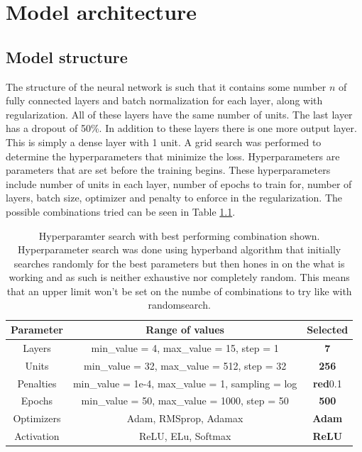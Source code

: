 
\chapter{Model architecture} %

\label{Chapter4} %


\section{Model structure}
The structure of the neural network is such that it contains some number $n$ of fully connected layers and batch normalization for each layer, along with regularization. All of these layers have the same number of units. The last layer has a dropout of 50\%. In addition to these layers there is one more output layer. This is simply a dense layer with 1 unit. A grid search was performed to determine the hyperparameters that minimize the loss. Hyperparameters are parameters that are set before the training begins\cite{hyperparameters_definition}. These hyperparameters include number of units in each layer, number of epochs to train for, number of layers, batch size, optimizer and penalty to enforce in the regularization. The possible combinations tried can be seen in Table \ref{table:gridSearchHyperparamters}.

\begin{table}[h]
    \centering
    \caption[Hyperparamter search with best performing combination.]{Hyperparamter search with best performing combination shown. Hyperparameter search was done using hyperband algorithm that initially searches randomly for the best parameters but then hones in on the what is working and as such is neither exhaustive nor completely random. This means that an upper limit won't be set on the numbe of combinations to try like with randomsearch.}
    \label{table:gridSearchHyperparamters}
    \begin{tabular}{c|c|c}
        Parameter & Range of values & Selected\\\hline
        Layers &  min\_value = 4, max\_value = 15, step = 1 & \textbf{7}\\\hline
        Units &  min\_value = 32, max\_value = 512, step = 32 & \textbf{256}\\\hline
        Penalties & min\_value = 1e-4, max\_value = 1, sampling = log & \textbf{red}{0.1}\\\hline
        Epochs & min\_value = 50, max\_value = 1000, step = 50 & \textbf{500}\\\hline
        Optimizers & Adam, RMSprop, Adamax & \textbf{Adam}\\\hline
        Activation & ReLU, ELu, Softmax & \textbf{ReLU}\\\hline
    \end{tabular}
\end{table}

